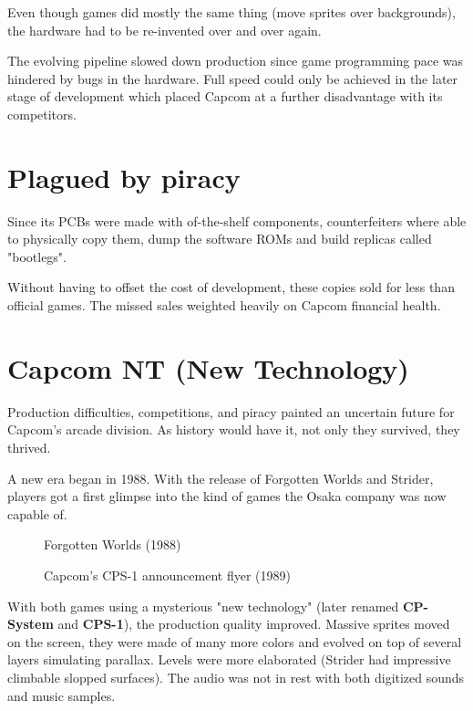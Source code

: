 Even though games did mostly the same thing (move sprites over backgrounds), the hardware had to be re-invented over and over again. 

The evolving pipeline slowed down production since game programming pace was hindered by bugs in the hardware. Full speed could only be achieved in the later stage of development which placed Capcom at a further disadvantage with its competitors.





\section{Plagued by piracy}
Since its PCBs were made with of-the-shelf components, counterfeiters where able to physically copy them, dump the software ROMs and build replicas called "bootlegs". 

Without having to offset the cost of development, these copies sold for less than official games. The missed sales weighted heavily on Capcom financial health. 




\section{Capcom NT (New Technology)}
Production difficulties, competitions, and piracy painted an uncertain future for Capcom's arcade division. As history would have it, not only they survived, they thrived.

A new era began in 1988. With the release of Forgotten Worlds and Strider, players got a first glimpse into the kind of games the Osaka company was now capable of.  



\label{nin_fw}
\begin{figure}[H]
\caption*{Forgotten Worlds (1988)}
\end{figure}



 
\label{fw_flyer}
  \begin{figure}[H]
  \caption*{Capcom's CPS-1 announcement flyer (1989)}
  \end{figure}

With both games using a mysterious "new technology" (later renamed \textbf{CP-System} and \textbf{CPS-1}), the production quality improved. Massive sprites moved on the screen, they were made of many more colors and evolved on top of several layers simulating parallax. Levels were more elaborated (Strider had impressive climbable slopped surfaces). The audio was not in rest with both digitized sounds and music samples.

